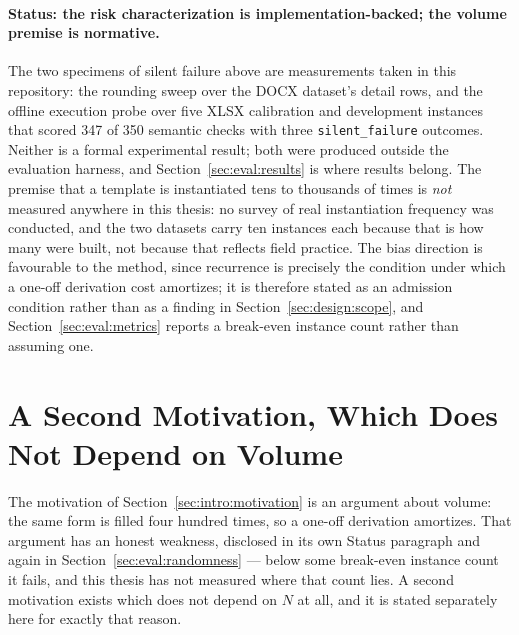 \paragraph{Status: the risk characterization is implementation-backed; the volume premise is
normative.}
The two specimens of silent failure above are measurements taken in this repository: the
rounding sweep over the DOCX dataset's detail rows, and the offline execution probe over
five XLSX calibration and development instances that scored 347 of 350 semantic checks with
three \texttt{silent\_failure} outcomes. Neither is a formal experimental result; both were
produced outside the evaluation harness, and Section~\ref{sec:eval:results} is where results
belong. The premise that a template is instantiated tens to thousands of times is \emph{not}
measured anywhere in this thesis: no survey of real instantiation frequency was conducted,
and the two datasets carry ten instances each because that is how many were built, not
because that reflects field practice. The bias direction is favourable to the method, since
recurrence is precisely the condition under which a one-off derivation cost amortizes; it is
therefore stated as an admission condition rather than as a finding in
Section~\ref{sec:design:scope}, and Section~\ref{sec:eval:metrics} reports a break-even
instance count rather than assuming one.

\section{A Second Motivation, Which Does Not Depend on Volume}
\label{sec:intro:confidentiality}

%
%

The motivation of Section~\ref{sec:intro:motivation} is an argument about volume: the same
form is filled four hundred times, so a one-off derivation amortizes. That argument has an
honest weakness, disclosed in its own Status paragraph and again in
Section~\ref{sec:eval:randomness} --- below some break-even instance count it fails, and this
thesis has not measured where that count lies. A second motivation exists which does not
depend on $N$ at all, and it is stated separately here for exactly that reason.

